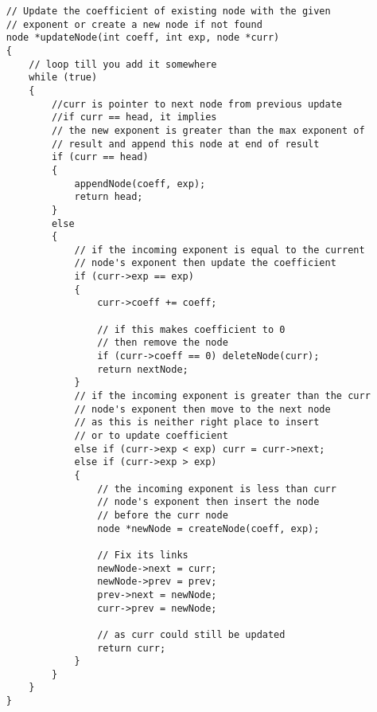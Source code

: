 \begin{lstlisting}
    // Update the coefficient of existing node with the given 
    // exponent or create a new node if not found
    node *updateNode(int coeff, int exp, node *curr)
    {
        // loop till you add it somewhere
        while (true)
        {
            //curr is pointer to next node from previous update
            //if curr == head, it implies
            // the new exponent is greater than the max exponent of  
            // result and append this node at end of result
            if (curr == head)
            {
                appendNode(coeff, exp);
                return head;
            }
            else
            {
                // if the incoming exponent is equal to the current 
                // node's exponent then update the coefficient
                if (curr->exp == exp)
                {
                    curr->coeff += coeff;

                    // if this makes coefficient to 0 
                    // then remove the node
                    if (curr->coeff == 0) deleteNode(curr);
                    return nextNode;
                }
                // if the incoming exponent is greater than the curr  
                // node's exponent then move to the next node
                // as this is neither right place to insert 
                // or to update coefficient 
                else if (curr->exp < exp) curr = curr->next;
                else if (curr->exp > exp)
                {
                    // the incoming exponent is less than curr
                    // node's exponent then insert the node 
                    // before the curr node
                    node *newNode = createNode(coeff, exp);
                    
                    // Fix its links
                    newNode->next = curr;
                    newNode->prev = prev;
                    prev->next = newNode;
                    curr->prev = newNode;
                
                    // as curr could still be updated
                    return curr;    
                }
            }
        }
    }
\end{lstlisting}

